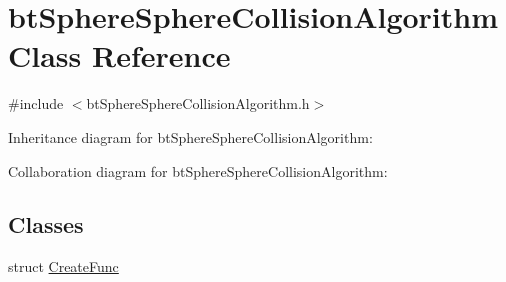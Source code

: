 \hypertarget{classbt_sphere_sphere_collision_algorithm}{\section{bt\+Sphere\+Sphere\+Collision\+Algorithm Class Reference}
\label{classbt_sphere_sphere_collision_algorithm}
}


{\ttfamily \#include $<$bt\+Sphere\+Sphere\+Collision\+Algorithm.\+h$>$}



Inheritance diagram for bt\+Sphere\+Sphere\+Collision\+Algorithm\+:


Collaboration diagram for bt\+Sphere\+Sphere\+Collision\+Algorithm\+:
\subsection*{Classes}
\begin{DoxyCompactItemize}
\item 
struct \hyperlink{structbt_sphere_sphere_collision_algorithm_1_1_create_func}{Create\+Func}
\end{DoxyCompactItemize}
